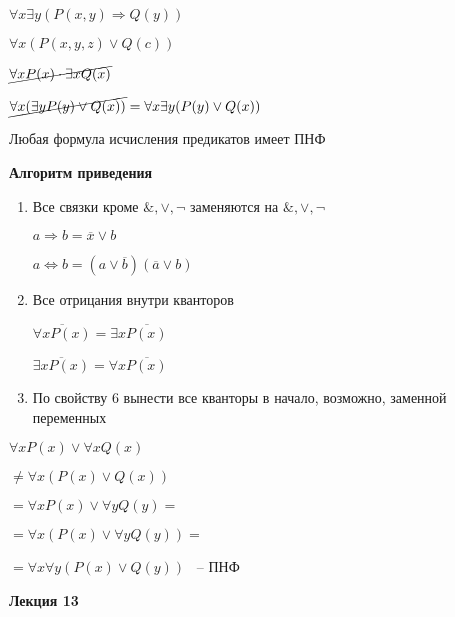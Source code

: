 \documentclass[russian]{lecture-notes}
\begin{document}
\begin{example}
	$\forall x \exists y (P(x, y) \Rightarrow Q(y))$
\end{example}

\begin{example}
	$\forall x (P(x, y, z) \lor Q(c))$
\end{example}

\begin{example}
	$\cancel{\forall x P(x) \cdot \exists x Q(x)}$
\end{example}

\begin{example}
	$\cancel{\forall x (\exists y P(y) \lor Q(x))}  = \forall x \exists y (P(y) \lor Q(x))$
\end{example}
	
	
\begin{theorem}
	Любая формула исчисления предикатов имеет ПНФ
\end{theorem}

	\textbf{Алгоритм приведения}
	
\begin{enumerate}
\item{
	Все связки кроме $\&, \lor, \neg$ заменяются на $\&, \lor, \neg$
	
	$a \Rightarrow b = \overline{x} \lor b$
	
	$a \Leftrightarrow b = (a \lor \overline{b})(\overline{a} \lor b)$ 
}

\item{
	Все отрицания внутри кванторов
	
	$\overline{\forall x P(x)} = \exists x \overline{P(x)}$
	
	$\overline{\exists x P(x)} = \forall x \overline{P(x)}$ 
}

\item{
	По свойству 6 вынести все кванторы в начало, возможно, заменной переменных
}
\end{enumerate}


\begin{example}
	$\forall x P(x) \lor \forall x Q(x)$
	
	$\neq \forall x (P(x) \lor Q(x))$	
	
	$ = \forall x P(x) \lor \forall y Q(y) = $
	
	$= \forall x (P(x) \lor \forall y Q(y)) = $
	
	$= \forall x \forall y (P(x) \lor Q(y))$ ~-- ПНФ
\end{example}


	\textbf{Лекция 13}
	
\end{document}
